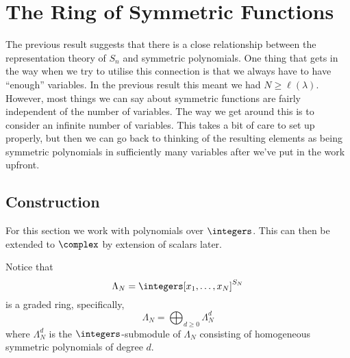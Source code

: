 \section{The Ring of Symmetric Functions}
The previous result suggests that there is a close relationship between the representation theory of \(S_n\) and symmetric polynomials.
One thing that gets in the way when we try to utilise this connection is that we always have to have \enquote{enough} variables.
In the previous result this meant we had \(N \ge \ell(\lambda)\).
However, most things we can say about symmetric functions are fairly independent of the number of variables.
The way we get around this is to consider an infinite number of variables.
This takes a bit of care to set up properly, but then we can go back to thinking of the resulting elements as being symmetric polynomials in sufficiently many variables after we've put in the work upfront.

\subsection{Construction}
For this section we work with polynomials over \(\integers\).
This can then be extended to \(\complex\) by extension of scalars later.

Notice that
\begin{equation}
    \Lambda_N = \integers[x_1, \dotsc, x_N]^{S_N}
\end{equation}
is a graded ring, specifically,
\begin{equation}
    \Lambda_N = \bigoplus_{d \ge 0} \Lambda_N^d
\end{equation}
where \(\Lambda_N^d\) is the \(\integers\)-submodule of \(\Lambda_N\) consisting of homogeneous symmetric polynomials of degree \(d\).

